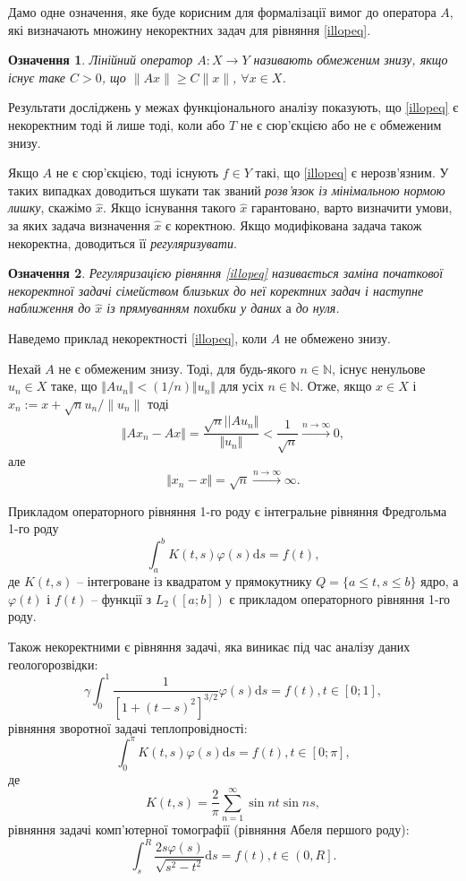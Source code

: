 \documentclass[14pt,twoside]{extreport}
\theoremstyle{mystyle}
\newtheorem{dfn}{Означення}
\numberwithin{equation}{chapter}
\begin{document}
Дамо одне означення, яке буде корисним для формалізації вимог до оператора $A$, які визначають множину некоректних задач для рівняння \eqref{illopeq}.

\begin{dfn}
	Лінійний оператор $A:X\to  Y$ називають обмеженим знизу, якщо існує таке $C>0$, що $\|Ax\| \geqslant C\|x\|$, $\forall x \in X$.
\end{dfn}

Результати досліджень у межах функціонального аналізу показують, що \eqref{illopeq} є некоректним тоді й лише тоді, коли або $T$ не є сюр'єкцією або не є обмеженим знизу.

Якщо $A$ не є сюр'єкцією, тоді існують $f\in Y$ такі, що \eqref{illopeq} є нерозв'язним. У таких випадках доводиться шукати так званий \emph{розв'язок із мінімальною нормою лишку}, скажімо $\hat{x}$. Якщо існування такого $\hat{x}$ гарантовано, варто визначити умови, за яких задача визначення $\hat{x}$ є коректною. Якщо модифікована задача також некоректна, доводиться її \emph{регуляризувати}.

\begin{dfn}
	Регуляризацією рівняння \eqref{illopeq} називається заміна початкової некоректної задачі сімейством \emph{близьких до неї} коректних задач і наступне наближення до $\hat{x}$ із прямуванням похибки у даних $а$ до нуля.
\end{dfn}

Наведемо приклад некоректності \eqref{illopeq}, коли $A$ не обмежено знизу.

Нехай $A$ не є обмеженим знизу. Тоді, для будь-якого $n\in \mathbb{N}$, існує ненульове $u_n \in X$ таке, що $\Vert Au_{n}\Vert<(1/n)\Vert u_{n}\Vert$ для усіх $n\in \mathbb{N}$. Отже, якщо $x\in X$ і $x_{n} :=x+\sqrt{n}u_{n}/\|u_{n}\|$ тоді
$$
\Vert Ax_{n}-Ax\Vert=\frac{\sqrt{n}||Au_{n}\Vert}{\Vert u_{n}\Vert}<\frac{1}{\sqrt{n}}\xrightarrow{n\to\infty} 0,
$$
але
$$
\Vert x_{n}-x\Vert=\sqrt{n}\xrightarrow{n\to\infty}\infty.
$$

Прикладом операторного рівняння 1-го роду є інтегральне рівняння Фредгольма 1-го роду
\begin{equation}\label{fred1oncemore}
 \int_{a}^{b} K(t, s) \varphi(s) \mathrm{d}s = f(t),
\end{equation}
де $K(t, s)$ -- інтегроване із квадратом у прямокутнику $Q=\{a \leqslant t, s \leqslant b\}$ ядро, а $\varphi(t)$ і $f(t)$ -- функції з $L_2([a; b])$ є прикладом операторного рівняння 1-го роду.

Також некоректними є рівняння задачі, яка виникає під час аналізу даних геологорозвідки:
\[
 \gamma\int_{0}^{1} \dfrac{1}{[1+(t-s)^2]^{3/2}}\varphi(s)\mathrm{d}s = f(t), t\in[0;1],
\]
рівняння зворотної задачі теплопровідності:
\[
 \int_{0}^{\pi} K(t, s) \varphi(s)\mathrm{d}s = f(t), t\in\left[0; \pi\right],
\]
де
\[
 K(t,s) = \dfrac{2}{\pi} \sum\limits_{n=1}^{\infty} \sin nt \sin ns,
\]
рівняння задачі комп'ютерної томографії (рівняння Абеля першого роду):
\[
 \int_{s}^{R} \dfrac{2s\varphi(s)}{\sqrt{s^2-t^2}}\mathrm{d}s = f(t), t\in \left(0, R\right].
\]
\end{document}
